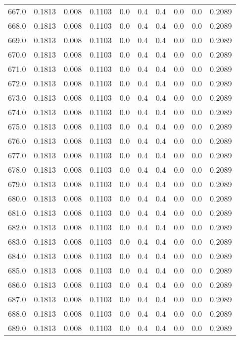 \begin{longtable}{lrrrrrrrrr}
667.0 & 0.1813 & 0.008 & 0.1103 & 0.0 & 0.4 & 0.4 & 0.0 & 0.0 & 0.2089 \\
668.0 & 0.1813 & 0.008 & 0.1103 & 0.0 & 0.4 & 0.4 & 0.0 & 0.0 & 0.2089 \\
669.0 & 0.1813 & 0.008 & 0.1103 & 0.0 & 0.4 & 0.4 & 0.0 & 0.0 & 0.2089 \\
670.0 & 0.1813 & 0.008 & 0.1103 & 0.0 & 0.4 & 0.4 & 0.0 & 0.0 & 0.2089 \\
671.0 & 0.1813 & 0.008 & 0.1103 & 0.0 & 0.4 & 0.4 & 0.0 & 0.0 & 0.2089 \\
672.0 & 0.1813 & 0.008 & 0.1103 & 0.0 & 0.4 & 0.4 & 0.0 & 0.0 & 0.2089 \\
673.0 & 0.1813 & 0.008 & 0.1103 & 0.0 & 0.4 & 0.4 & 0.0 & 0.0 & 0.2089 \\
674.0 & 0.1813 & 0.008 & 0.1103 & 0.0 & 0.4 & 0.4 & 0.0 & 0.0 & 0.2089 \\
675.0 & 0.1813 & 0.008 & 0.1103 & 0.0 & 0.4 & 0.4 & 0.0 & 0.0 & 0.2089 \\
676.0 & 0.1813 & 0.008 & 0.1103 & 0.0 & 0.4 & 0.4 & 0.0 & 0.0 & 0.2089 \\
677.0 & 0.1813 & 0.008 & 0.1103 & 0.0 & 0.4 & 0.4 & 0.0 & 0.0 & 0.2089 \\
678.0 & 0.1813 & 0.008 & 0.1103 & 0.0 & 0.4 & 0.4 & 0.0 & 0.0 & 0.2089 \\
679.0 & 0.1813 & 0.008 & 0.1103 & 0.0 & 0.4 & 0.4 & 0.0 & 0.0 & 0.2089 \\
680.0 & 0.1813 & 0.008 & 0.1103 & 0.0 & 0.4 & 0.4 & 0.0 & 0.0 & 0.2089 \\
681.0 & 0.1813 & 0.008 & 0.1103 & 0.0 & 0.4 & 0.4 & 0.0 & 0.0 & 0.2089 \\
682.0 & 0.1813 & 0.008 & 0.1103 & 0.0 & 0.4 & 0.4 & 0.0 & 0.0 & 0.2089 \\
683.0 & 0.1813 & 0.008 & 0.1103 & 0.0 & 0.4 & 0.4 & 0.0 & 0.0 & 0.2089 \\
684.0 & 0.1813 & 0.008 & 0.1103 & 0.0 & 0.4 & 0.4 & 0.0 & 0.0 & 0.2089 \\
685.0 & 0.1813 & 0.008 & 0.1103 & 0.0 & 0.4 & 0.4 & 0.0 & 0.0 & 0.2089 \\
686.0 & 0.1813 & 0.008 & 0.1103 & 0.0 & 0.4 & 0.4 & 0.0 & 0.0 & 0.2089 \\
687.0 & 0.1813 & 0.008 & 0.1103 & 0.0 & 0.4 & 0.4 & 0.0 & 0.0 & 0.2089 \\
688.0 & 0.1813 & 0.008 & 0.1103 & 0.0 & 0.4 & 0.4 & 0.0 & 0.0 & 0.2089 \\
689.0 & 0.1813 & 0.008 & 0.1103 & 0.0 & 0.4 & 0.4 & 0.0 & 0.0 & 0.2089 \\

\end{longtable}
